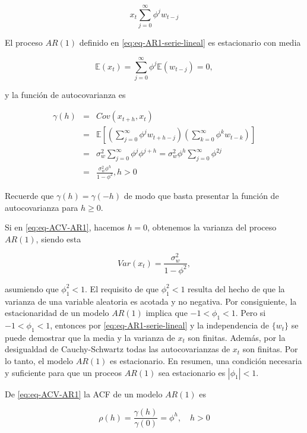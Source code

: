 \documentclass[12pt,]{krantz}
\theoremstyle{definition}
\theoremstyle{definition}
\theoremstyle{definition}
\theoremstyle{remark}
\begin{document}
\begin{equation}
x_t \sum_{j=0}^{\infty}\phi^jw_{t-j}
\label{eq:eq-AR1-serie-lineal}
\end{equation}

El proceso \(AR(1)\) definido en \eqref{eq:eq-AR1-serie-lineal} es
estacionario con media

\[\mathbb{E}(x_t) = \sum_{j=0}^{\infty}\phi^j\mathbb{E}(w_{t-j})=0,\]

y la función de autocovarianza es

\begin{eqnarray}
\gamma(h) &=& Cov(x_{t+h},x_t) \nonumber \\
    &=& \mathbb{E}\left[\left(\sum_{j=0}^{\infty}\phi^jw_{t+h-j}\right) \left(\sum_{k=0}^{\infty}\phi^kw_{t-k}\right)\right] \nonumber \\
    &=& \sigma_w^2\sum_{j=0}^{\infty}\phi^j\phi^{j+h} = \sigma_w^2\phi^h\sum_{j=0}^{\infty}\phi^{2j} \nonumber \\
    &=& \frac{\sigma_w^2\phi^h}{1-\phi^2}, h>0
\label{eq:eq-ACV-AR1}
\end{eqnarray}

Recuerde que \(\gamma(h)=\gamma(-h)\) de modo que basta presentar la
función de autocovarianza para \(h\geq0\).

Si en \eqref{eq:eq-ACV-AR1}, hacemos \(h=0\), obtenemos la varianza del
proceso \(AR(1)\), siendo esta

\[Var(x_t)=\frac{\sigma_w^2}{1-\phi^2},\]

asumiendo que \(\phi_1^2<1\). El requisito de que \(\phi_1^2<1\) resulta
del hecho de que la varianza de una variable aleatoria es acotada y no
negativa. Por consiguiente, la estacionaridad de un modelo \(AR(1)\)
implica que \(-1<\phi_1<1\). Pero si \(-1<\phi_1<1\), entonces por
\eqref{eq:eq-AR1-serie-lineal} y la independencia de \(\{w_t\}\) se puede
demostrar que la media y la varianza de \(x_t\) son finitas. Además, por
la desigualdad de Cauchy-Schwartz todas las autocovarianzas de \(x_t\)
son finitas. Por lo tanto, el modelo \(AR(1)\) es estacionario. En
resumen, una condición necesaria y suficiente para que un proceos
\(AR(1)\) sea estacionario es \(|\phi_1|<1\).

De \eqref{eq:eq-ACV-AR1} la ACF de un modelo \(AR(1)\) es

\begin{equation}
\rho(h) = \frac{\gamma(h)}{\gamma(0)} = \phi^h, \quad h>0
\label{eq:eq-ACF-AR1}
\end{equation}
\end{document}
